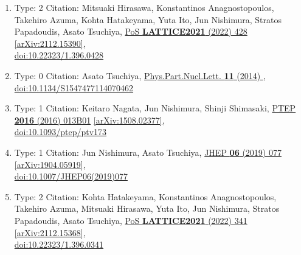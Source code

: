 \documentclass[a4paper,10pt]{article}
\begin{document}
\begin{enumerate}
\begin{enumerate}
  \item Type: 2 Citation: Mitsuaki Hirasawa, Konstantinos Anagnostopoulos, Takehiro Azuma, Kohta Hatakeyama, Yuta Ito, Jun Nishimura, Stratos Papadoudis, Asato Tsuchiya, \href{https://www.doi.org/10.22323/1.396.0428}{PoS {\bf LATTICE2021} (2022) 428}  \href{https://arxiv.org/abs/2112.15390}{[arXiv:2112.15390]},\\\href{https://www.doi.org/10.22323/1.396.0428}{doi:10.22323/1.396.0428}
  \item Type: 0 Citation: Asato Tsuchiya, \href{https://www.doi.org/10.1134/S1547477114070462}{Phys.Part.Nucl.Lett. {\bf 11} (2014) },\\\href{https://www.doi.org/10.1134/S1547477114070462}{doi:10.1134/S1547477114070462}
  \item Type: 1 Citation: Keitaro Nagata, Jun Nishimura, Shinji Shimasaki, \href{https://www.doi.org/10.1093/ptep/ptv173}{PTEP {\bf 2016} (2016) 013B01}  \href{https://arxiv.org/abs/1508.02377}{[arXiv:1508.02377]},\\\href{https://www.doi.org/10.1093/ptep/ptv173}{doi:10.1093/ptep/ptv173}
  \item Type: 1 Citation: Jun Nishimura, Asato Tsuchiya, \href{https://www.doi.org/10.1007/JHEP06(2019)077}{JHEP {\bf 06} (2019) 077}  \href{https://arxiv.org/abs/1904.05919}{[arXiv:1904.05919]},\\\href{https://www.doi.org/10.1007/JHEP06(2019)077}{doi:10.1007/JHEP06(2019)077}
  \item Type: 2 Citation: Kohta Hatakeyama, Konstantinos Anagnostopoulos, Takehiro Azuma, Mitsuaki Hirasawa, Yuta Ito, Jun Nishimura, Stratos Papadoudis, Asato Tsuchiya, \href{https://www.doi.org/10.22323/1.396.0341}{PoS {\bf LATTICE2021} (2022) 341}  \href{https://arxiv.org/abs/2112.15368}{[arXiv:2112.15368]},\\\href{https://www.doi.org/10.22323/1.396.0341}{doi:10.22323/1.396.0341}

\end{enumerate}
\end{enumerate}
\end{document}
